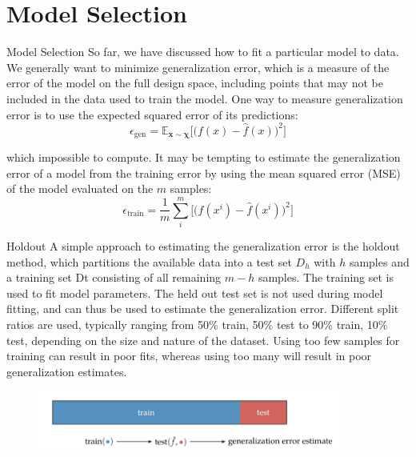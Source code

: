 \documentclass{beamer}
\begin{document}
\section{Model Selection}

\begin{frame}{Model Selection}
So far, we have discussed how to fit a particular model to data. We generally want to minimize generalization error, which is a measure of the error of the model on the full design space, including points that may not be included in the data used to train the model. One way to measure generalization error is to use the expected squared error of its predictions:
\begin{equation*}
    \epsilon_{\textrm{gen}} = \mathbb{E}_{\boldsymbol{x} \sim \boldsymbol{\chi}} \bigg[\bigg(f(x)-\hat{f}(x)\bigg)^2\bigg]
\end{equation*}

which impossible to compute. It may be tempting to estimate the generalization error of a model from the training error by using the mean squared error (MSE) of the model evaluated on the $m$ samples:
\begin{equation*}
    \epsilon_{\textrm{train}} = \frac{1}{m} \sum_i^m \bigg[\bigg(f(x^i)-\hat{f}(x^i)\bigg)^2\bigg]
\end{equation*}

\end{frame}

\begin{frame}{Holdout}
A simple approach to estimating the generalization error is the holdout method, which partitions the available data into a test set $D_h$ with $h$ samples and a training set Dt consisting of all remaining $m-h$ samples. The training set is used to fit model parameters. The held out test set is not used during model fitting, and can thus be used to estimate the generalization error. Different split ratios are used, typically ranging from 50\% train, 50\% test to 90\% train, 10\% test, depending on the size and nature of the dataset. Using too few samples for training can result in poor fits, whereas using too many will result in poor generalization estimates.
\begin{figure}
\centering
\includegraphics[width=100mm]{Figs/holdout.jpeg}
\end{figure} 

\end{frame}
\end{document}
